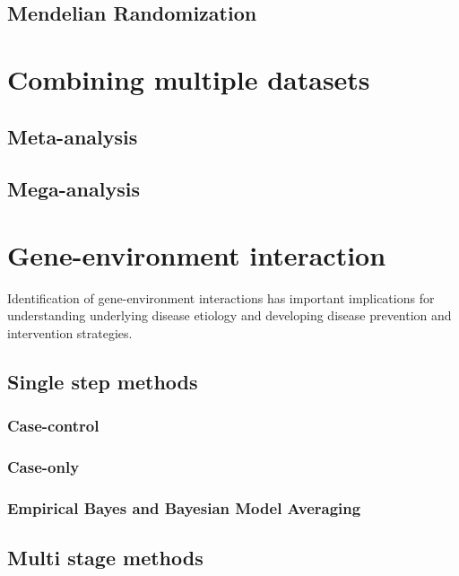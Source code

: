 \documentclass[]{book}
\theoremstyle{definition}
\theoremstyle{definition}
\theoremstyle{definition}
\theoremstyle{remark}
\begin{document}
\section{Mendelian Randomization}\label{mendelian-randomization}

\chapter{Combining multiple datasets}\label{combining-multiple-datasets}

\section{Meta-analysis}\label{meta-analysis}

\section{Mega-analysis}\label{mega-analysis}

\chapter{Gene-environment
interaction}\label{gene-environment-interaction}

Identification of gene-environment interactions has important
implications for understanding underlying disease etiology and
developing disease prevention and intervention strategies.

\section{Single step methods}\label{single-step-methods}

\subsection{Case-control}\label{case-control}

\subsection{Case-only}\label{case-only}

\subsection{Empirical Bayes and Bayesian Model
Averaging}\label{empirical-bayes-and-bayesian-model-averaging}

\section{Multi stage methods}\label{multi-stage-methods}
\end{document}
